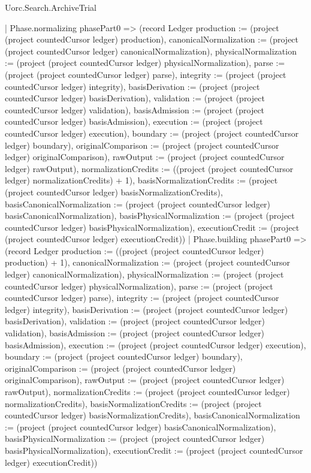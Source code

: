 \begin{lexlean}{Uorc.Search.ArchiveTrial}
\begin{semanticmodule}
{{    | Phase.normalizing phasePart0 => (record Ledger {production := (project (project countedCursor ledger) production), canonicalNormalization := (project (project countedCursor ledger) canonicalNormalization), physicalNormalization := (project (project countedCursor ledger) physicalNormalization), parse := (project (project countedCursor ledger) parse), integrity := (project (project countedCursor ledger) integrity), basisDerivation := (project (project countedCursor ledger) basisDerivation), validation := (project (project countedCursor ledger) validation), basisAdmission := (project (project countedCursor ledger) basisAdmission), execution := (project (project countedCursor ledger) execution), boundary := (project (project countedCursor ledger) boundary), originalComparison := (project (project countedCursor ledger) originalComparison), rawOutput := (project (project countedCursor ledger) rawOutput), normalizationCredits := ((project (project countedCursor ledger) normalizationCredits) + 1), basisNormalizationCredits := (project (project countedCursor ledger) basisNormalizationCredits), basisCanonicalNormalization := (project (project countedCursor ledger) basisCanonicalNormalization), basisPhysicalNormalization := (project (project countedCursor ledger) basisPhysicalNormalization), executionCredit := (project (project countedCursor ledger) executionCredit)})
    | Phase.building phasePart0 => (record Ledger {production := ((project (project countedCursor ledger) production) + 1), canonicalNormalization := (project (project countedCursor ledger) canonicalNormalization), physicalNormalization := (project (project countedCursor ledger) physicalNormalization), parse := (project (project countedCursor ledger) parse), integrity := (project (project countedCursor ledger) integrity), basisDerivation := (project (project countedCursor ledger) basisDerivation), validation := (project (project countedCursor ledger) validation), basisAdmission := (project (project countedCursor ledger) basisAdmission), execution := (project (project countedCursor ledger) execution), boundary := (project (project countedCursor ledger) boundary), originalComparison := (project (project countedCursor ledger) originalComparison), rawOutput := (project (project countedCursor ledger) rawOutput), normalizationCredits := (project (project countedCursor ledger) normalizationCredits), basisNormalizationCredits := (project (project countedCursor ledger) basisNormalizationCredits), basisCanonicalNormalization := (project (project countedCursor ledger) basisCanonicalNormalization), basisPhysicalNormalization := (project (project countedCursor ledger) basisPhysicalNormalization), executionCredit := (project (project countedCursor ledger) executionCredit)})
}}
\end{semanticmodule}
\end{lexlean}
